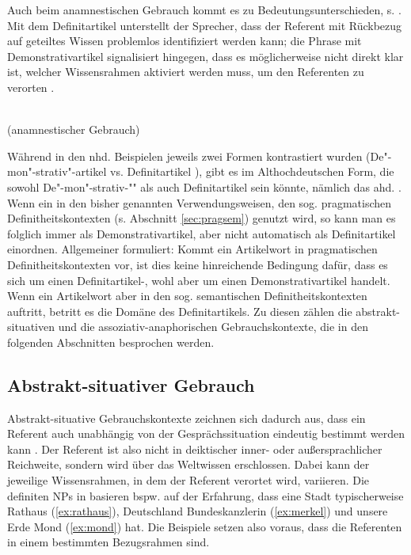 Auch beim anamnestischen Gebrauch kommt es zu Bedeutungsunterschieden, s. . Mit dem Definitartikel unterstellt der Sprecher,  dass der Referent mit Rückbezug auf geteiltes Wissen problemlos identifiziert werden kann; die Phrase mit Demonstrativartikel signalisiert hingegen, dass es möglicherweise nicht direkt klar ist, welcher Wissensrahmen aktiviert werden muss, um den Referenten zu verorten \parencite[79-80]{Bisle-Muller1991}. 
 
\begin{exe}
	\ex \label{ex:anamndef}  \\ (anamnestischer Gebrauch)
\end{exe}
 
Während in den nhd. Beispielen jeweils zwei Formen kontrastiert wurden (De"-mon"-strativ"-artikel  vs. Definitartikel ), gibt es im Althochdeutschen  Form, die sowohl De"-mon"-strativ-"" als auch Definitartikel sein könnte, nämlich das ahd. . 
Wenn ein   in den bisher genannten Verwendungsweisen, den sog. pragmatischen Definitheitskontexten (s. Abschnitt \ref{sec:pragsem}) genutzt wird, so kann man es folglich immer als Demonstrativartikel, aber nicht automatisch als Definitartikel einordnen. Allgemeiner formuliert: Kommt ein Artikelwort in pragmatischen Definitheitskontexten vor, ist dies keine  hinreichende Bedingung dafür, dass es sich um einen Definitartikel-, wohl aber um einen Demonstrativartikel handelt. Wenn ein Artikelwort aber in den sog. semantischen Definitheitskontexten auftritt, betritt es die Domäne des Definitartikels. Zu diesen zählen die abstrakt-situativen und die assoziativ-anaphorischen Gebrauchskontexte, die in den folgenden Abschnitten besprochen werden. 



\subsection{Abstrakt-situativer Gebrauch}\label{sec:abst-sit}

Abstrakt-situative Gebrauchskontexte zeichnen sich dadurch aus, dass ein Referent auch unabhängig von der Gesprächssituation eindeutig bestimmt werden kann \parencite[daher auch , vgl.][115]{Hawkins1978}. Der  Referent ist also nicht in deiktischer inner- oder außersprachlicher Reichweite, sondern wird über das Weltwissen erschlossen. Dabei kann der jeweilige Wissensrahmen, in dem der Referent verortet wird, variieren. Die definiten NPs in  basieren bspw. auf der Erfahrung, dass eine Stadt typischerweise  Rathaus (\ref{ex:rathaus}),  Deutschland   Bundeskanzlerin (\ref{ex:merkel})  und unsere Erde  Mond (\ref{ex:mond}) hat. Die Beispiele setzen also voraus, dass die Referenten in einem bestimmten Bezugsrahmen  \parencite{Russell2006} sind. 

